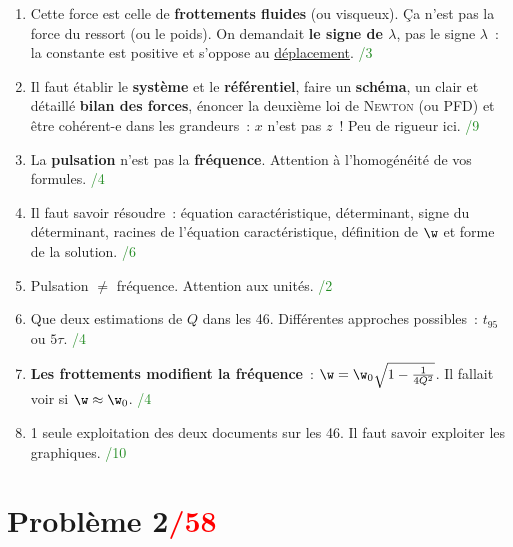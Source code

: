 \documentclass[a4paper, 10pt, final, garamond]{book}
\begin{document}
\begin{enumerate}
    \item Cette force est celle de \textbf{frottements fluides} (ou visqueux).
        Ça n'est pas la force du ressort (ou le poids). On demandait \textbf{le
        signe de $\lambda$}, pas le signe  $\lambda$~: la
        constante est positive et s'oppose au \ul{déplacement}.
        \hfill \textcolor{ForestGreen}{/3}

    \item Il faut établir le \textbf{système} et le \textbf{référentiel}, faire
        un \textbf{schéma}, un clair et détaillé \textbf{bilan des forces},
        énoncer la deuxième loi de \textsc{Newton} (ou PFD) et être cohérent-e
        dans les grandeurs~: $x$ n'est pas $z$~! Peu de rigueur ici.
        \hfill \textcolor{ForestGreen}{/9}

    \item La \textbf{pulsation} n'est pas la \textbf{fréquence}. Attention à
        l'homogénéité de vos formules.
        \hfill \textcolor{ForestGreen}{/4}

    \item Il faut savoir résoudre~: équation caractéristique, déterminant, signe
        du déterminant, racines de l'équation caractéristique, définition de
        $\w$ et forme de la solution.
        \hfill \textcolor{ForestGreen}{/6}

    \item Pulsation $\neq$ fréquence. Attention aux unités.
        \hfill \textcolor{ForestGreen}{/2}

    \item Que deux estimations de $Q$ dans les 46. Différentes approches
        possibles~: $t_{95}$ ou $5\tau$.
        \hfill \textcolor{ForestGreen}{/4}

    \item \textbf{Les frottements modifient la fréquence}~: $\w = \w_0 \sqrt{1 -
        \frac{1}{4Q^2}}$. Il fallait voir si $\w \approx \w_0$.
        \hfill \textcolor{ForestGreen}{/4}

    \item 1 seule exploitation des deux documents sur les 46. Il faut savoir
        exploiter les graphiques.
        \hfill \textcolor{ForestGreen}{/10}
\end{enumerate}

\section{Problème 2\hfill \textcolor{red}{/58}}
\end{document}
